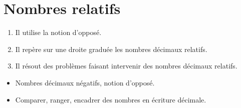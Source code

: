 \themaN
\graphicspath{{../../S04_Nombres_relatifs/Images/}}

\chapter{Nombres relatifs}
\label{S04}


\begin{autoeval}
   \small
   \begin{enumerate}
      \item Il utilise la notion d'opposé.
      \item Il repère sur une droite graduée les nombres décimaux relatifs.
      \item Il résout des problèmes faisant intervenir des nombres décimaux relatifs.
   \end{enumerate}
\end{autoeval}

\begin{prerequis}
   \begin{itemize}
      \item Nombres décimaux négatifs, notion d'opposé.
      \item[\com] Comparer, ranger, encadrer des nombres en écriture décimale.
   \end{itemize}
\end{prerequis}

\vfill

\def\thermo{\pspolygon[linearc=0.1,fillstyle=solid](-0.1,6.8)(-0.1,0.6)(-0.2,0.4)(-0.2,-0.1)(0.2,-0.1)(0.2,0.4)(0.1,0.6)(0.1,6.8) \pspolygon[linecolor=B1, linearc=0.1, fillstyle=solid, fillcolor=B1](0,5)(0,0.5)(-0.1,0.3)(-0.1,0)(0.1,0)(0.1,0.3)(0,0.5) \pscircle(0,6.7){0.05}}
            
